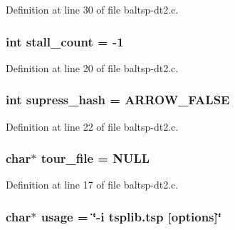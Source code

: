 Definition at line 30 of file baltsp-dt2.c.\hypertarget{bin_2baltsp-dt2_8c_a1641a28cf3ea572a56763e84518c17b}{
\subsubsection[{stall\_\-count}]{\setlength{\rightskip}{0pt plus 5cm}int {\bf stall\_\-count} = -1}}
\label{bin_2baltsp-dt2_8c_a1641a28cf3ea572a56763e84518c17b}




Definition at line 20 of file baltsp-dt2.c.\hypertarget{bin_2baltsp-dt2_8c_c022145e682345ed4064bad274e5a4f1}{
\subsubsection[{supress\_\-hash}]{\setlength{\rightskip}{0pt plus 5cm}int {\bf supress\_\-hash} = ARROW\_\-FALSE}}
\label{bin_2baltsp-dt2_8c_c022145e682345ed4064bad274e5a4f1}




Definition at line 22 of file baltsp-dt2.c.\hypertarget{bin_2baltsp-dt2_8c_b818a82f867be75d7c4d92d792b0943e}{
\subsubsection[{tour\_\-file}]{\setlength{\rightskip}{0pt plus 5cm}char$\ast$ {\bf tour\_\-file} = NULL}}
\label{bin_2baltsp-dt2_8c_b818a82f867be75d7c4d92d792b0943e}




Definition at line 17 of file baltsp-dt2.c.\hypertarget{bin_2baltsp-dt2_8c_adebe2487a2c5240ab6cd02c83add0bf}{
\subsubsection[{usage}]{\setlength{\rightskip}{0pt plus 5cm}char$\ast$ {\bf usage} = \char`\"{}-i tsplib.tsp \mbox{[}{\bf options}\mbox{]}\char`\"{}}}
\label{bin_2baltsp-dt2_8c_adebe2487a2c5240ab6cd02c83add0bf}




